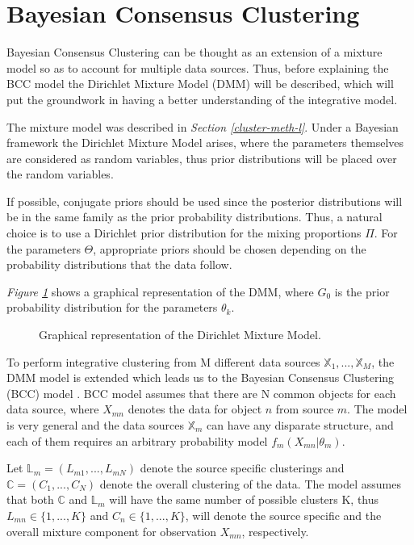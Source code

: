 \section{Bayesian Consensus Clustering} \label{bcc-sec-l}
Bayesian Consensus Clustering can be thought as an extension of a mixture model so as to account for multiple data sources. Thus, before explaining the BCC model the Dirichlet Mixture Model (DMM) will be described, which will put the groundwork in having a better understanding of the integrative model.

The mixture model was described in \emph{Section \ref{cluster-meth-l}}. Under a Bayesian framework the Dirichlet Mixture Model arises, where the parameters themselves are considered as random variables, thus prior distributions will be placed over the random variables. 

If possible, conjugate priors should be used since the posterior distributions will be in the same family as the prior probability distributions. Thus, a natural choice is to use a Dirichlet prior distribution for the mixing proportions $\Pi$. For the parameters $\Theta$, appropriate priors should be chosen depending on the probability distributions that the data follow.

\emph{Figure \ref{fdmm-pic}} shows a graphical representation of the DMM, where $G_{0}$ is the prior probability distribution for the parameters $\theta_{k}$.

\begin{figure}[ht]
  \begin{center}
      
  \caption{Graphical representation of the Dirichlet Mixture Model.}
  \label{fdmm-pic}
  \end{center}
\end{figure}

To perform integrative clustering from M different data sources $\mathbb{X}_{1},..., \mathbb{X}_{M}$, the DMM model is extended which leads us to the Bayesian Consensus Clustering (BCC) model \cite{Lock2013}. BCC model assumes that there are N common objects for each data source, where $X_{mn}$ denotes the data for object $n$ from source $m$.
The model is very general and the data sources $\mathbb{X}_{m}$ can have any disparate structure, and each of them requires an arbitrary probability model $f_{m}(X_{mn}|\theta_{m})$.

Let $\mathbb{L}_{m} = (L_{m1},...,L_{mN})$ denote the source specific clusterings and $\mathbb{C} = (C_{1},...,C_{N})$ denote the overall clustering of the data. The model assumes that both $\mathbb{C}$ and $\mathbb{L}_{m}$ will have the same number of possible clusters K, thus $L_{mn} \in \lbrace 1,...,K \rbrace$ and $C_{n} \in \lbrace 1,...,K \rbrace$, will denote the source specific and the overall mixture component for observation $X_{mn}$, respectively.

